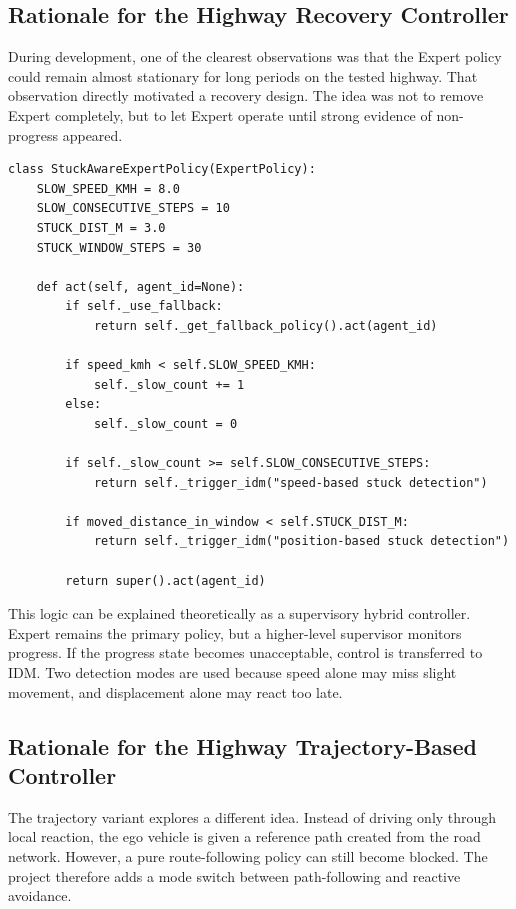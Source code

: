 \documentclass[12pt,a4paper]{report}
\begin{document}
\subsection{Rationale for the Highway Recovery Controller}
During development, one of the clearest observations was that the Expert policy could remain almost stationary for long periods on the tested highway. That observation directly motivated a recovery design. The idea was not to remove Expert completely, but to let Expert operate until strong evidence of non-progress appeared.

\begin{lstlisting}[caption={Core recovery logic of the highway Expert+IDM policy.},label={lst:expert_idm_logic},float=H]
class StuckAwareExpertPolicy(ExpertPolicy):
    SLOW_SPEED_KMH = 8.0
    SLOW_CONSECUTIVE_STEPS = 10
    STUCK_DIST_M = 3.0
    STUCK_WINDOW_STEPS = 30

    def act(self, agent_id=None):
        if self._use_fallback:
            return self._get_fallback_policy().act(agent_id)

        if speed_kmh < self.SLOW_SPEED_KMH:
            self._slow_count += 1
        else:
            self._slow_count = 0

        if self._slow_count >= self.SLOW_CONSECUTIVE_STEPS:
            return self._trigger_idm("speed-based stuck detection")

        if moved_distance_in_window < self.STUCK_DIST_M:
            return self._trigger_idm("position-based stuck detection")

        return super().act(agent_id)
\end{lstlisting}

This logic can be explained theoretically as a supervisory hybrid controller. Expert remains the primary policy, but a higher-level supervisor monitors progress. If the progress state becomes unacceptable, control is transferred to IDM. Two detection modes are used because speed alone may miss slight movement, and displacement alone may react too late.

\subsection{Rationale for the Highway Trajectory-Based Controller}
The trajectory variant explores a different idea. Instead of driving only through local reaction, the ego vehicle is given a reference path created from the road network. However, a pure route-following policy can still become blocked. The project therefore adds a mode switch between path-following and reactive avoidance.
\end{document}
